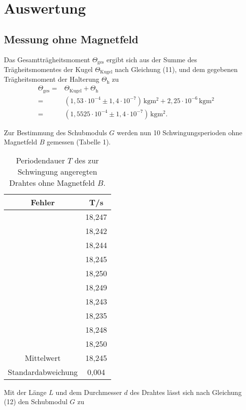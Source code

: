 \section{Auswertung}
\label{sec:Auswertung}

\subsection{Messung ohne Magnetfeld}
Das Gesamtträgheitsmoment $\Theta_\text{ges}$ ergibt sich aus der Summe des Trägheitsmomentes
der Kugel $\Theta_\text{Kugel}$ nach Gleichung (11), und dem gegebenen Trägheitsmoment der Halterung $\Theta_\text{h}$ zu
\begin{align*}
  \Theta_\text{ges} = {} & \Theta_\text{Kugel} + \Theta_\text{h} \\
                    = {} & (1,53 \cdot 10^{-4} \pm 1,4 \cdot 10^{-7})\,\si{\kilo\gram\meter\squared} + 2,25 \cdot 10^{-6}\,\si{\kilo\gram\meter\squared} \\
                    = {} & (1,5525 \cdot 10^{-4} \pm 1,4 \cdot 10^{-7})\,\si{\kilo\gram\meter\squared}.
\end{align*}

\noindent Zur Bestimmung des Schubmoduls $G$ werden nun 10 Schwingungsperioden ohne Magnetfeld $B$ gemessen (Tabelle 1).


\begin{table}[H]
\centering
\caption{Periodendauer $T$ des zur Schwingung angeregten Drahtes ohne Magnetfeld $B$.}
\label{tab:ohnebfeld}
\begin{tabular}{c c}
\toprule
Fehler & T\:/\:s\\
\midrule
 & 18,247 \\
 & 18,242 \\
 & 18,244 \\
 & 18,245 \\
 & 18,250 \\
 & 18,249 \\
 & 18,243 \\
 & 18,235 \\
 & 18,248 \\
 & 18,250 \\
\hline
Mittelwert & 18,245 \\
Standardabweichung & 0,004 \\
\bottomrule
\end{tabular}
\end{table}

\noindent Mit der Länge $L$ und dem Durchmesser $d$ des Drahtes lässt sich nach Gleichung (12) den Schubmodul $G$ zu 


